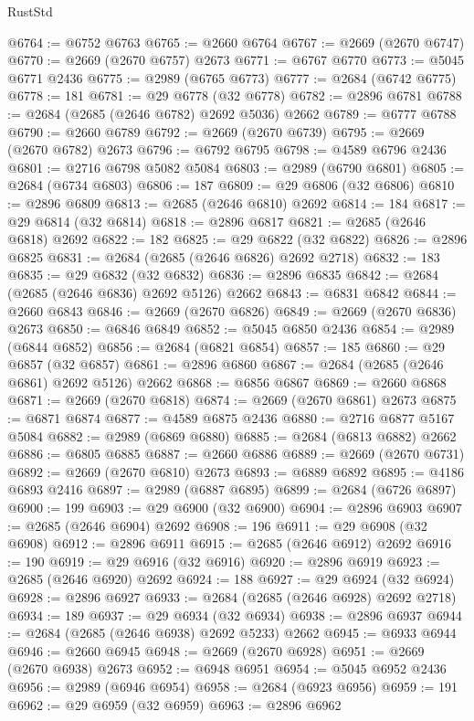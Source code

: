 \begin{lexlean}{RustStd}
\begin{coremodule}
@6764 := @6752 @6763
@6765 := @2660 @6764
@6767 := @2669 (@2670 @6747)
@6770 := @2669 (@2670 @6757) @2673
@6771 := @6767 @6770
@6773 := @5045 @6771 @2436
@6775 := @2989 (@6765 @6773)
@6777 := @2684 (@6742 @6775)
@6778 := 181
@6781 := @29 @6778 (@32 @6778)
@6782 := @2896 @6781
@6788 := @2684 (@2685 (@2646 @6782) @2692 @5036) @2662
@6789 := @6777 @6788
@6790 := @2660 @6789
@6792 := @2669 (@2670 @6739)
@6795 := @2669 (@2670 @6782) @2673
@6796 := @6792 @6795
@6798 := @4589 @6796 @2436
@6801 := @2716 @6798 @5082 @5084
@6803 := @2989 (@6790 @6801)
@6805 := @2684 (@6734 @6803)
@6806 := 187
@6809 := @29 @6806 (@32 @6806)
@6810 := @2896 @6809
@6813 := @2685 (@2646 @6810) @2692
@6814 := 184
@6817 := @29 @6814 (@32 @6814)
@6818 := @2896 @6817
@6821 := @2685 (@2646 @6818) @2692
@6822 := 182
@6825 := @29 @6822 (@32 @6822)
@6826 := @2896 @6825
@6831 := @2684 (@2685 (@2646 @6826) @2692 @2718)
@6832 := 183
@6835 := @29 @6832 (@32 @6832)
@6836 := @2896 @6835
@6842 := @2684 (@2685 (@2646 @6836) @2692 @5126) @2662
@6843 := @6831 @6842
@6844 := @2660 @6843
@6846 := @2669 (@2670 @6826)
@6849 := @2669 (@2670 @6836) @2673
@6850 := @6846 @6849
@6852 := @5045 @6850 @2436
@6854 := @2989 (@6844 @6852)
@6856 := @2684 (@6821 @6854)
@6857 := 185
@6860 := @29 @6857 (@32 @6857)
@6861 := @2896 @6860
@6867 := @2684 (@2685 (@2646 @6861) @2692 @5126) @2662
@6868 := @6856 @6867
@6869 := @2660 @6868
@6871 := @2669 (@2670 @6818)
@6874 := @2669 (@2670 @6861) @2673
@6875 := @6871 @6874
@6877 := @4589 @6875 @2436
@6880 := @2716 @6877 @5167 @5084
@6882 := @2989 (@6869 @6880)
@6885 := @2684 (@6813 @6882) @2662
@6886 := @6805 @6885
@6887 := @2660 @6886
@6889 := @2669 (@2670 @6731)
@6892 := @2669 (@2670 @6810) @2673
@6893 := @6889 @6892
@6895 := @4186 @6893 @2416
@6897 := @2989 (@6887 @6895)
@6899 := @2684 (@6726 @6897)
@6900 := 199
@6903 := @29 @6900 (@32 @6900)
@6904 := @2896 @6903
@6907 := @2685 (@2646 @6904) @2692
@6908 := 196
@6911 := @29 @6908 (@32 @6908)
@6912 := @2896 @6911
@6915 := @2685 (@2646 @6912) @2692
@6916 := 190
@6919 := @29 @6916 (@32 @6916)
@6920 := @2896 @6919
@6923 := @2685 (@2646 @6920) @2692
@6924 := 188
@6927 := @29 @6924 (@32 @6924)
@6928 := @2896 @6927
@6933 := @2684 (@2685 (@2646 @6928) @2692 @2718)
@6934 := 189
@6937 := @29 @6934 (@32 @6934)
@6938 := @2896 @6937
@6944 := @2684 (@2685 (@2646 @6938) @2692 @5233) @2662
@6945 := @6933 @6944
@6946 := @2660 @6945
@6948 := @2669 (@2670 @6928)
@6951 := @2669 (@2670 @6938) @2673
@6952 := @6948 @6951
@6954 := @5045 @6952 @2436
@6956 := @2989 (@6946 @6954)
@6958 := @2684 (@6923 @6956)
@6959 := 191
@6962 := @29 @6959 (@32 @6959)
@6963 := @2896 @6962

\end{coremodule}
\end{lexlean}
